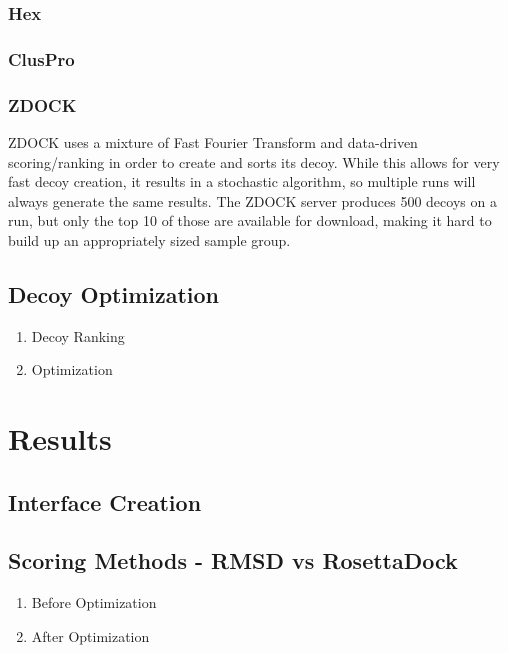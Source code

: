 \documentclass{article}
\begin{document}
\subsubsection{Hex}

\subsubsection{ClusPro}

\subsubsection{ZDOCK}
ZDOCK uses a mixture of Fast Fourier Transform and data-driven scoring/ranking in order to create and sorts its decoy. While this allows for very fast decoy creation, it results in a stochastic algorithm, so multiple runs will always generate the same results. The ZDOCK server produces 500 decoys on a run, but only the top 10 of those are available for download, making it hard to build up an appropriately sized sample group.

\subsection{Decoy Optimization}

\begin{enumerate}

\item Decoy Ranking

\item Optimization

\end{enumerate}



\section{Results}

\subsection{Interface Creation}

\subsection{Scoring Methods - RMSD vs RosettaDock}

\begin{enumerate}

\item Before Optimization

\item After Optimization

\end{enumerate}
\end{document}
